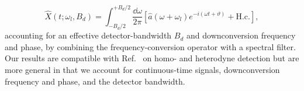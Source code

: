 \begin{equation}
	\hat{X}(t;\omega_l,B_d)
	=
	\int_{-B_d/2}^{+B_d/2}\frac{\dd{\omega}}{2\pi}
	\left[
		\hat{a}(\omega+\omega_l)
		e^{-i(\omega t+\vartheta)}
		+
		\text{H.c.}
	\right]
	,
\end{equation}
accounting for an effective detector-bandwidth $B_d$ and downconversion frequency and phase, by combining the frequency-conversion operator with a spectral filter.
Our results are compatible with Ref.~\cite{Gardiner2000,Shapiro2009,Loudon2000,Vogel2006,Kikuchi2016} on homo- and heterodyne detection but are more general in that we account for continuous-time signals, downconversion frequency and phase, and the detector bandwidth.